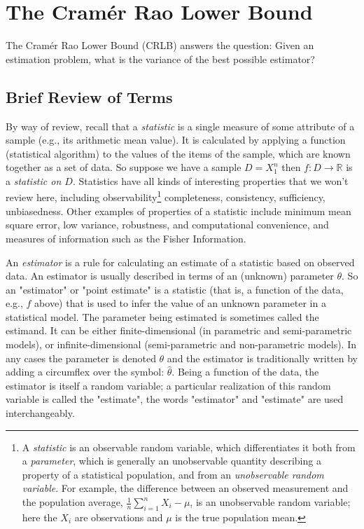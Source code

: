 \documentclass{article}
\theoremstyle{definition}
\begin{document}
\section{The Cram\'er Rao Lower Bound}
\label{sec:crlb}
The Cram\'er Rao Lower Bound (CRLB) answers the question: Given
an estimation problem, what is the variance of the best possible
estimator?

\subsection{Brief Review of Terms}
By way of review, recall that a \emph{statistic} is a single
measure of some attribute of a sample (e.g., its arithmetic mean
value). It is calculated by applying a function (statistical
algorithm) to the values of the items of the sample, which are
known together as a set of data. So suppose we have a sample $D=
X_1^n$ then $f:D \rightarrow \mathbb{R}$ is a \emph{statistic on
$D$}. Statistics have all kinds of interesting properties that we
won't review here, including
observability\footnote{{A \emph{statistic} is an
observable random variable, which differentiates it both from a
\emph{parameter}, which is generally an unobservable quantity
describing a property of a statistical population, and from an
\emph{unobservable random variable}. For example, the difference
between an observed measurement and the population average,
$\frac{1}{n} \sum\limits_{i = 1}^n X_i - \mu$, is an unobservable
random variable; here the $X_i$ are observations and $\mu$ is the
true population mean. \par}} completeness, consistency,
sufficiency, unbiasedness.  Other examples of properties of a
statistic include minimum mean square error, low variance,
robustness, and computational convenience, and measures of
information such as the Fisher Information.

\bigskip
\noindent
An \emph{estimator} is a rule for calculating an estimate of a
statistic based on observed data. An estimator is usually
described in terms of an (unknown) parameter $\theta$.  So an
"estimator" or "point estimate" is a statistic (that is, a
function of the data, e.g., $f$ above) that is used to infer the
value of an unknown parameter in a statistical model. The
parameter being estimated is sometimes called the estimand. It
can be either finite-dimensional (in parametric and
semi-parametric models), or infinite-dimensional (semi-parametric
and non-parametric models). In any cases the parameter is denoted
$\theta$ and the estimator is traditionally written by adding a
circumflex over the symbol: $\widehat {\theta}$. Being a function
of the data, the estimator is itself a random variable; a
particular realization of this random variable is called the
"estimate", the words "estimator" and "estimate" are used
interchangeably.
\end{document}
